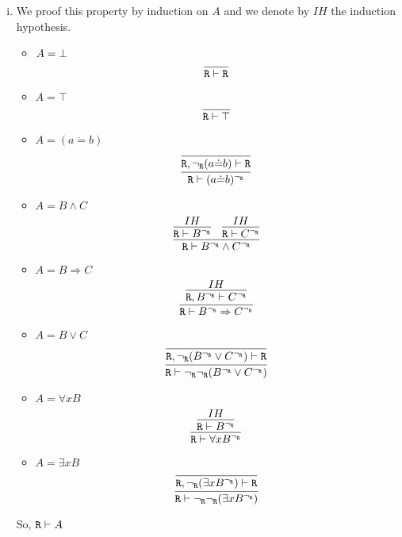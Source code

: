 \begin{enumerate}[(i)]
    \item We proof this property by induction on $A$ and we denote by $IH$ the induction hypothesis.
    \begin{itemize}
        \item $A=\bot$
            $$
                \infer{
                    \R \vdash \R
                }{
                }
            $$
        \item $A=\top$
            $$
                \infer{
                    \R \vdash \top
                }{
                }
            $$
        \item $A=(a\dot{=}b)$
            $$
                \infer{
                    \R \vdash (a\dot{=}b)^{\neg_\R}
                }{
                    \infer{
                        \R, \neg_\R(a\dot{=}b) \vdash \R
                    }{
                    }
                }
            $$
        \item $A=B\wedge C$
            $$
                \infer{
                    \R \vdash B^{\neg_\R} \wedge C^{\neg_\R}
                }{
                    \infer{
                        \R \vdash B^{\neg_\R}
                    }{
                        IH
                    }&
                    \infer{
                        \R \vdash C^{\neg_\R}
                    }{
                        IH
                    }
                }
            $$
        \item $A=B \Rightarrow C$
            $$
                \infer{
                    \R \vdash B^{\neg_\R} \Rightarrow C^{\neg_\R}
                }{
                    \infer{
                        \R, B^{\neg_\R} \vdash C^{\neg_\R}
                    }{
                        IH
                    }
                }
            $$
        \item $A=B \vee C$
            $$
                \infer{
                    \R \vdash \neg_\R\neg_\R(B^{\neg_\R} \vee C^{\neg_\R})
                }{
                    \infer{
                        \R, \neg_\R(B^{\neg_\R} \vee C^{\neg_\R}) \vdash \R
                    }{
                    }
                }
            $$
        \item $A=\forall x B$
            $$
                \infer{
                    \R \vdash \forall x B^{\neg_\R}
                }{
                    \infer{
                        \R \vdash B^{\neg_\R}
                    }{
                        IH
                    }
                }
            $$
        \item $A=\exists x B$
            $$
                \infer{
                    \R \vdash \neg_\R\neg_\R(\exists x B^{\neg_\R})
                }{
                    \infer{
                        \R, \neg_\R(\exists x B^{\neg_\R}) \vdash \R
                    }{
                    }
                }
            $$
    \end{itemize}
    So, $\texttt{R}\vdash A$
\end{enumerate}
